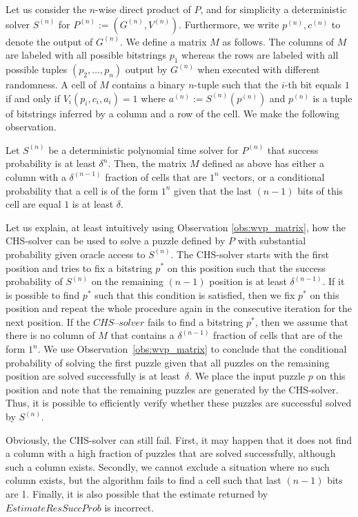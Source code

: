 Let us consider the $n$-wise direct product of $P$, and for simplicity a deterministic solver $S^{(n)}$ for $P^{(n)} := (G^{(n)}, V^{(n)})$.
Furthermore, we write $p^{(n)}, c^{(n)}$ to denote the output of $G^{(n)}$.
We define a matrix $M$ as follows. The columns of $M$ are labeled with all possible bitstrings $p_1$
whereas the rows are labeled with all possible tuples $(p_2, \dotsc, p_n)$ output by $G^{(n)}$ when executed with different randomness.
A cell of $M$ contains a binary $n$-tuple such that the $i$-th bit equals $1$ if and only if $V_i(p_i, c_i, a_i) = 1$ where
 $a^{(n)} := S^{(n)}(p^{(n)})$ and $p^{(n)}$ is a tuple of bitstrings inferred by a column and a row of the cell.
We make the following observation.
%
\begin{observation}
\label{obs:wvp_matrix}
Let $S^{(n)}$ be a deterministic polynomial time solver for $P^{(n)}$ that success probability is at least $\delta^{n}$.
Then, the matrix $M$ defined as above has either a column with a $\delta^{(n-1)}$ fraction of cells that are $1^n$ vectors, or
a conditional probability that a cell is of the form $1^n$ given that the last $(n-1)$ bits of this cell are equal $1$ is at least $\delta$.
\end{observation}
%
Let us explain, at least intuitively using Observation \ref{obs:wvp_matrix}, how the CHS-solver can be used to solve a puzzle defined by $P$
with substantial probability given oracle access to $S^{(n)}$.
The CHS-solver starts with the first position and tries to fix a bitstring $p^*$ on this position such that the success probability of $S^{(n)}$ on the remaining $(n-1)$
position is at least $\delta^{(n-1)}$. If it is possible to find $p^*$ such that this condition is satisfied, then we fix $p^*$
on this position and repeat the whole procedure again in the consecutive iteration for the next position.
If the $\mathit{CHS\text{--}solver}$ fails to find a bitstring $p^*$, then we assume that there is no column of $M$ that contains a $\delta^{(n-1)}$ fraction
of cells that are of the form $1^n$. We use Observation~\ref{obs:wvp_matrix} to conclude that the conditional probability of
solving the first puzzle given that all puzzles on the remaining position are solved successfully is at least~$\delta$.
We place the input puzzle $p$ on this position and note that the remaining puzzles are generated by the CHS-solver.
Thus, it is possible to efficiently verify whether these puzzles are successful solved by $S^{(n)}$.

Obviously, the CHS-solver can still fail. First, it may happen that it does not find a column
with a high fraction of puzzles that are solved successfully, although such a column exists.
Secondly, we cannot exclude a situation where no such column exists, but the algorithm fails to find a cell such that last $(n\!-\!1)$ bits are 1.
Finally, it is also possible that the estimate returned by $\mathit{EstimateResSuccProb}$ is incorrect.

